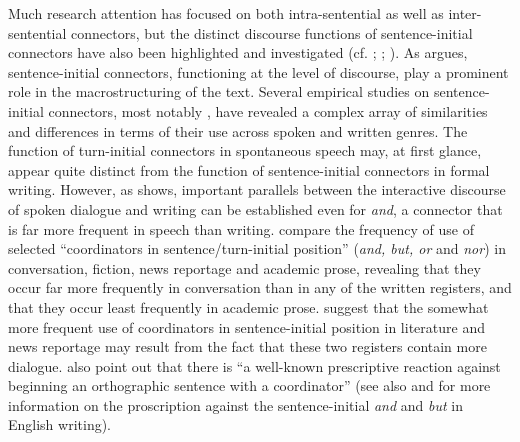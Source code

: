 \documentclass[output=paper]{langscibook}
\begin{document}
Much research attention has focused on both intra-sentential as well as inter-sentential connectors, but the distinct discourse functions of sentence-initial connectors have also been highlighted and investigated (cf. \citealt{VanDijk1977}; \citealt{Moreno1995}; \citealt{Dupont2018}). As \citet[56]{Moreno1995} argues, sentence-initial connectors, functioning at the level of discourse, play a prominent role in the macrostructuring of the text. Several empirical studies on sentence-initial connectors, most notably \citet{BiberEtAl1999}, have revealed a complex array of similarities and differences in terms of their use across spoken and written genres. The function of turn-initial connectors in spontaneous speech may, at first glance, appear quite distinct from the function of sentence-initial connectors in formal writing. However, as \citet{Dorgeloh2004} shows, important parallels between the interactive discourse of spoken dialogue and writing can be established even for \textit{and}, a connector that is far more frequent in speech than writing. \citet[83--84]{BiberEtAl1999} compare the frequency of use of selected “coordinators in sentence/turn-initial position” (\textit{and, but, or} and \textit{nor}) in conversation, fiction, news reportage and academic prose, revealing that they occur far more frequently in conversation than in any of the written registers, and that they occur least frequently in academic prose. \citet[84]{BiberEtAl1999} suggest that the somewhat more frequent use of coordinators in sentence-initial position in literature and news reportage may result from the fact that these two registers contain more dialogue. \citet[83]{BiberEtAl1999} also point out that there is “a well-known prescriptive reaction against beginning an orthographic sentence with a coordinator” (see also \citealt{Dorgeloh2004} and \citealt{Bell2007} for more information on the proscription against the sentence-initial \textit{and} and \textit{but} in English writing).
\end{document}
